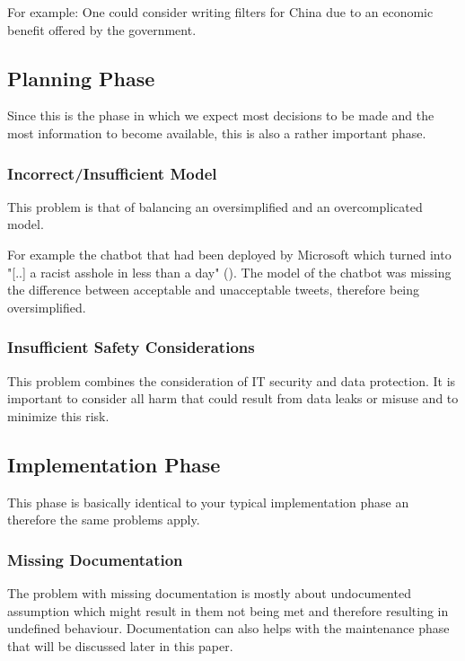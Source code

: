 For example:
One could consider writing filters for China due to an economic benefit offered by the government.

\subsection{Planning Phase}
Since this is the phase in which we expect most decisions to be made and 
the most information to become available, this is also a rather important phase.

\subsubsection{Incorrect/Insufficient Model}

This problem is that of balancing an oversimplified and an overcomplicated model.

For example the chatbot that had been deployed by Microsoft
 which turned into "[..] a racist asshole in less than a day" (\cite{James2018}). The model of the chatbot was missing 
 the difference between acceptable and unacceptable tweets,
 therefore being oversimplified.
 
\subsubsection{Insufficient Safety Considerations}

This problem combines the consideration of IT security and data protection. It is important to consider all harm that could result from data leaks or misuse and to minimize this risk.

\subsection{Implementation Phase}
This phase is basically identical to your typical implementation 
phase an therefore the same problems apply.

\subsubsection{Missing Documentation}

The problem with missing documentation is mostly about undocumented assumption which might result in them not being met and therefore resulting in undefined behaviour. Documentation can also helps with the maintenance phase that will be discussed later in this paper.

